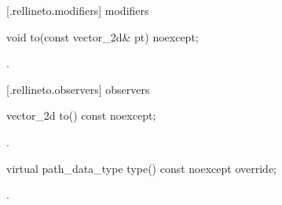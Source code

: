  [\iotwod.rellineto.modifiers]{ modifiers}

\begin{itemdecl}
    void to(const vector_2d& pt) noexcept;
\end{itemdecl}
\begin{itemdescr}
	\pnum
	\postconditions
	.
	
\end{itemdescr}

 [\iotwod.rellineto.observers]{ observers}

\begin{itemdecl}
    vector_2d to() const noexcept;
\end{itemdecl}
\begin{itemdescr}
	\pnum
	\returns
	.

\end{itemdescr}

\begin{itemdecl}
    virtual path_data_type type() const noexcept override;
\end{itemdecl}
\begin{itemdescr}
	\pnum
	\returns
	.

\end{itemdescr}
